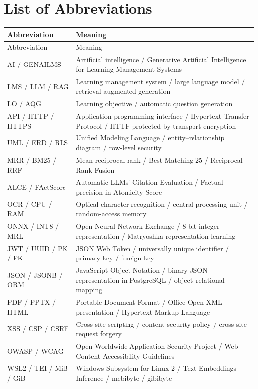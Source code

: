 \section*{List of Abbreviations}
\begingroup\small
\begin{longtable}{|p{3.0cm}|p{11.7cm}|}\hline
Abbreviation & Meaning\\\hline\endfirsthead
\hline Abbreviation & Meaning\\\hline\endhead
AI / GENAILMS & Artificial intelligence / Generative Artificial Intelligence for Learning Management Systems\\\hline
LMS / LLM / RAG & Learning management system / large language model / retrieval-augmented generation\\\hline
LO / AQG & Learning objective / automatic question generation\\\hline
API / HTTP / HTTPS & Application programming interface / Hypertext Transfer Protocol / HTTP protected by transport encryption\\\hline
UML / ERD / RLS & Unified Modeling Language / entity--relationship diagram / row-level security\\\hline
MRR / BM25 / RRF & Mean reciprocal rank / Best Matching 25 / Reciprocal Rank Fusion\\\hline
ALCE / FActScore & Automatic LLMs' Citation Evaluation / Factual precision in Atomicity Score\\\hline
OCR / CPU / RAM & Optical character recognition / central processing unit / random-access memory\\\hline
ONNX / INT8 / MRL & Open Neural Network Exchange / 8-bit integer representation / Matryoshka representation learning\\\hline
JWT / UUID / PK / FK & JSON Web Token / universally unique identifier / primary key / foreign key\\\hline
JSON / JSONB / ORM & JavaScript Object Notation / binary JSON representation in PostgreSQL / object--relational mapping\\\hline
PDF / PPTX / HTML & Portable Document Format / Office Open XML presentation / Hypertext Markup Language\\\hline
XSS / CSP / CSRF & Cross-site scripting / content security policy / cross-site request forgery\\\hline
OWASP / WCAG & Open Worldwide Application Security Project / Web Content Accessibility Guidelines\\\hline
WSL2 / TEI / MiB / GiB & Windows Subsystem for Linux 2 / Text Embeddings Inference / mebibyte / gibibyte\\\hline
\end{longtable}\endgroup
